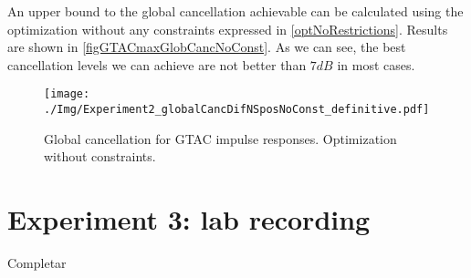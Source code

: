 An upper bound to the global cancellation achievable can be calculated using the optimization without any constraints expressed in \autoref{optNoRestrictions}. Results are shown in \autoref{figGTACmaxGlobCancNoConst}. As we can see, the best cancellation levels we can achieve are not better than $7\si{dB}$ in most cases.

\begin{figure}
	\centering
	\texttt{[image: ./Img/Experiment2\_globalCancDifNSposNoConst\_definitive.pdf]}
	\caption{Global cancellation for GTAC impulse responses. Optimization without constraints.}
	\label{figGTACmaxGlobCancNoConst}
\end{figure}

\section{Experiment 3: lab recording}
Completar
